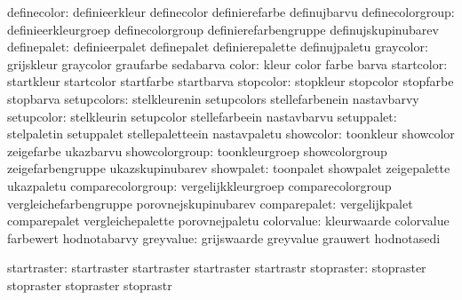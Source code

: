                   definecolor:  definieerkleur               definecolor
                                definierefarbe               definujbarvu
             definecolorgroup:  definieerkleurgroep          definecolorgroup
                                definierefarbengruppe        definujskupinubarev
                  definepalet:  definieerpalet               definepalet
                                definierepalette             definujpaletu
                    graycolor:  grijskleur                   graycolor
                                graufarbe                    sedabarva
                        color:  kleur                        color
                                farbe                        barva
                   startcolor:  startkleur                   startcolor
                                startfarbe                   startbarva
                    stopcolor:  stopkleur                    stopcolor
                                stopfarbe                    stopbarva
                  setupcolors:  stelkleurenin                setupcolors
                                stellefarbenein              nastavbarvy
                   setupcolor:  stelkleurin                  setupcolor
                                stellefarbeein               nastavbarvu
                   setuppalet:  stelpaletin                  setuppalet
                                stellepaletteein             nastavpaletu
                    showcolor:  toonkleur                    showcolor
                                zeigefarbe                   ukazbarvu
               showcolorgroup:  toonkleurgroep               showcolorgroup
                                zeigefarbengruppe            ukazskupinubarev
                    showpalet:  toonpalet                    showpalet
                                zeigepalette                 ukazpaletu
            comparecolorgroup:  vergelijkkleurgroep          comparecolorgroup
                                vergleichefarbengruppe       porovnejskupinubarev
                 comparepalet:  vergelijkpalet               comparepalet
                                vergleichepalette            porovnejpaletu
                   colorvalue:  kleurwaarde                  colorvalue
                                farbewert                    hodnotabarvy
                    greyvalue:  grijswaarde                  greyvalue
                                grauwert                     hodnotasedi

                  startraster:  startraster                  startraster
                                startraster                  startrastr
                   stopraster:  stopraster                   stopraster
                                stopraster                   stoprastr

